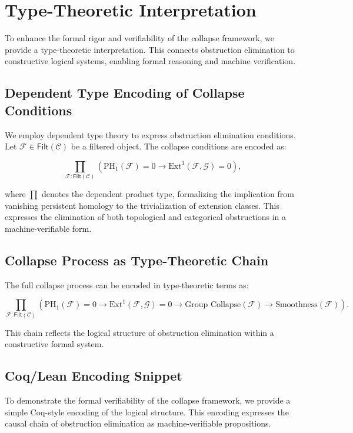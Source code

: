 \documentclass[11pt]{article}
\begin{document}
\section{Type-Theoretic Interpretation}

To enhance the formal rigor and verifiability of the collapse framework, we provide a type-theoretic interpretation. This connects obstruction elimination to constructive logical systems, enabling formal reasoning and machine verification.

\subsection{Dependent Type Encoding of Collapse Conditions}

We employ dependent type theory to express obstruction elimination conditions. Let $\mathcal{F} \in \mathsf{Filt}(\mathcal{C})$ be a filtered object. The collapse conditions are encoded as:

\[
\prod_{\mathcal{F} : \mathsf{Filt}(\mathcal{C})} 
\left( \mathrm{PH}_1(\mathcal{F}) = 0 \rightarrow \mathrm{Ext}^1(\mathcal{F}, \mathcal{G}) = 0 \right),
\]

where $\prod$ denotes the dependent product type, formalizing the implication from vanishing persistent homology to the trivialization of extension classes. This expresses the elimination of both topological and categorical obstructions in a machine-verifiable form.

\subsection{Collapse Process as Type-Theoretic Chain}

The full collapse process can be encoded in type-theoretic terms as:

\[
\prod_{\mathcal{F} : \mathsf{Filt}(\mathcal{C})} 
\left( 
\mathrm{PH}_1(\mathcal{F}) = 0 \rightarrow \mathrm{Ext}^1(\mathcal{F}, \mathcal{G}) = 0 
\rightarrow \text{Group Collapse}(\mathcal{F}) 
\rightarrow \text{Smoothness}(\mathcal{F})
\right).
\]

This chain reflects the logical structure of obstruction elimination within a constructive formal system.


\subsection{Coq/Lean Encoding Snippet}

To demonstrate the formal verifiability of the collapse framework, we provide a simple Coq-style encoding of the logical structure. This encoding expresses the causal chain of obstruction elimination as machine-verifiable propositions.
\end{document}
